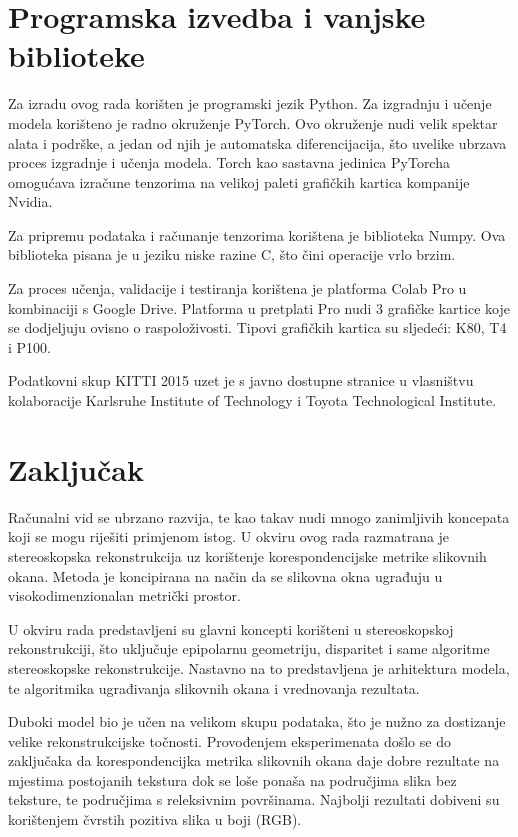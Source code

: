 \documentclass[times, utf8, zavrsni, numeric]{fer}
\begin{document}
\chapter{Programska izvedba i vanjske biblioteke}
Za izradu ovog rada korišten je programski jezik Python. Za izgradnju  i učenje modela korišteno je radno okruženje PyTorch. Ovo okruženje nudi velik spektar alata i podrške, a jedan od njih je automatska diferencijacija, što uvelike ubrzava proces izgradnje i učenja modela. Torch kao sastavna jedinica PyTorcha omogućava izračune tenzorima na velikoj paleti grafičkih kartica kompanije Nvidia.

 Za pripremu podataka i računanje tenzorima korištena je biblioteka Numpy. Ova biblioteka pisana je u jeziku niske razine C, što čini operacije vrlo brzim.
 
Za proces učenja, validacije i testiranja korištena je platforma Colab Pro u kombinaciji s Google Drive. Platforma u pretplati Pro nudi 3 grafičke kartice koje se dodjeljuju ovisno o raspoloživosti. Tipovi grafičkih kartica su sljedeći: K80, T4 i P100.

Podatkovni skup KITTI 2015 uzet je s javno dostupne stranice u vlasništvu kolaboracije Karlsruhe Institute of Technology i Toyota Technological Institute. 
\chapter{Zaključak}
Računalni vid se ubrzano razvija, te kao takav nudi mnogo zanimljivih koncepata koji se mogu riješiti primjenom istog. U okviru ovog rada razmatrana je stereoskopska rekonstrukcija uz korištenje korespondencijske metrike slikovnih okana. Metoda je koncipirana na način da se slikovna okna ugrađuju u visokodimenzionalan metrički prostor. 

U okviru rada predstavljeni su glavni koncepti korišteni u stereoskopskoj rekonstrukciji, što uključuje epipolarnu geometriju, disparitet i same algoritme stereoskopske rekonstrukcije. Nastavno na to predstavljena je arhitektura modela, te algoritmika ugrađivanja slikovnih okana i vrednovanja rezultata.

Duboki model bio je učen na velikom skupu podataka, što je nužno za dostizanje velike rekonstrukcijske točnosti. Provođenjem eksperimenata došlo se do zaključaka da korespondencijka metrika slikovnih okana daje dobre rezultate na mjestima postojanih tekstura dok se loše ponaša na područjima slika bez teksture, te područjima s releksivnim površinama. Najbolji rezultati dobiveni su korištenjem čvrstih pozitiva slika u boji (RGB).
\end{document}

